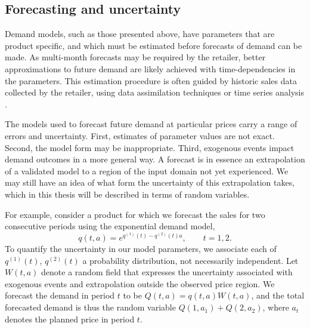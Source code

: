 \documentclass[main.tex]{subfiles}
\begin{document}
\subsection{Forecasting and uncertainty}
Demand models, such as those presented above, have parameters that are
product specific, and which must be estimated before forecasts of
demand can be made.
As multi-month forecasts may be required by the retailer, better
approximations to future demand are likely achieved with
time-dependencies in the parameters.
This estimation procedure is often guided by
historic sales data collected by the retailer, using data assimilation
techniques \citep{law2015data,riseth2017operator} or time series analysis
\citep{chatfield2004analysis}.

The models used to forecast future demand at particular prices carry
a range of errors and uncertainty. First, estimates of parameter values are not
exact. Second, the model form may be
inappropriate. Third, exogenous events impact demand outcomes in a more general
way.
A forecast is in essence an extrapolation of a validated model to a
region of the input domain not yet experienced. We may still have an
idea of what form the uncertainty of this extrapolation takes, which
in this thesis will be described in terms of random variables.

For example, consider a product for which we forecast the sales for
two consecutive periods using the exponential demand model,
\begin{equation}
  q(t,a) =
  e^{q^{(1)}(t)-q^{(2)}(t)a},\qquad t=1,2.
\end{equation}
To quantify the uncertainty in our model parameters, we associate
each of $q^{(1)}(t)$, $q^{(2)}(t)$ a probability distribution, not
necessarily independent.
Let $W(t,a)$ denote a random field that expresses the uncertainty
associated with exogenous events and extrapolation outside the
observed price region.
We forecast the demand in period $t$ to be $Q(t,a)=q(t,a)W(t,a)$, and
the total forecasted demand is thus the random variable $Q(1,a_1) +
Q(2,a_2)$, where $a_t$ denotes the planned price in period $t$.
\end{document}
